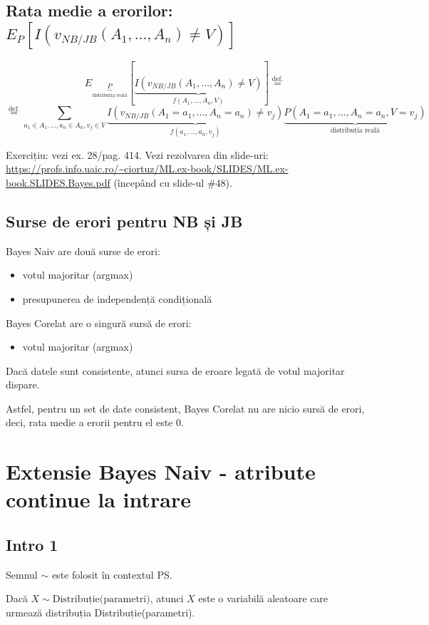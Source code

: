 \documentclass[12pt]{article}
\begin{document}
	\subsection{Rata medie a erorilor: $E_P [{I(v_{NB/JB}(A_1,\dots,A_n) \neq V)}]$}
	
	$$E_{\underbrace{{P}}_\text{distribuția reală}} [\underbrace{I(v_{NB/JB}(A_1,\dots,A_n) \neq V)}_{f(A_1,\dots,A_n,V)}] \stackrel{\text{def.}}{=} $$
	$$ \stackrel{\text{def.}}{=} \sum_{a_1\in A_1,\dots,a_n \in A_n, v_j \in V} \underbrace{I(v_{NB/JB}(A_1=a_1,\dots,A_n=a_n) \neq v_j)}_{f(a_1,\dots,a_n,v_j)} \underbrace{P(A_1=a_1,\dots,A_n=a_n,V=v_j)}_{\text{distribuția reală}} $$
	
	Exercițiu: vezi ex. 28/pag. 414. Vezi rezolvarea din slide-uri: \url{https://profs.info.uaic.ro/~ciortuz/ML.ex-book/SLIDES/ML.ex-book.SLIDES.Bayes.pdf} (începând cu slide-ul \#48).
	
	\subsection{Surse de erori pentru NB și JB}
	Bayes Naiv are două surse de erori:
	\begin{itemize}
		\item votul majoritar (argmax)
		\item presupunerea de independență condițională
	\end{itemize}


	Bayes Corelat are o singură sursă de erori:
	\begin{itemize}
		\item votul majoritar (argmax)
	\end{itemize}

	Dacă datele sunt consistente, atunci sursa de eroare legată de votul majoritar dispare.
	
	Astfel, pentru un set de date consistent, Bayes Corelat nu are nicio sursă de erori, deci, rata medie a erorii pentru el este 0.
	
	\section{Extensie Bayes Naiv - atribute continue la intrare}
	
	\subsection{Intro 1}
	Semnul $\sim$ este folosit în contextul PS. 
	
	Dacă $X \sim \text{Distribuție(parametri)}$, atunci $X$ este o variabilă aleatoare care urmează distribuția Distribuție(parametri).
	
\end{document}
